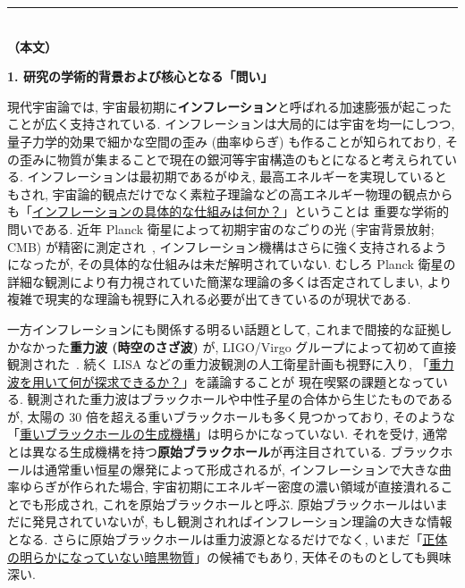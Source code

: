 \documentclass[11pt,a4paper,uplatex,dvipdfmx]{ujarticle} 		%
\newcommand{\研究課題名}{確率解析・原始ブラックホール・重力波観測から迫るインフレーション}
\newcommand{\研究機関名}{名古屋大学}
\newcommand{\研究代表者氏名}{多田祐一郎}
\newcommand{\研究期間の最終元号年度}{6}  %
\renewcommand{\emph}[1]{{\sffamily\gtfamily\bfseries #1}}
\begin{document}
\noindent
\rule{\linewidth}{1pt}\\
\noindent
\textbf{（本文）}

\begin{mdframed}[roundcorner=0.5zw,
	innertopmargin=0.8zw,innerbottommargin=0.8zw,
	linecolor=black!50,linewidth=0.2zw,
	backgroundcolor=black!10]
	{\bfseries\gtfamily\sffamily\large 1. 研究の学術的背景および核心となる「問い」}
\end{mdframed}

\noindent
現代宇宙論では, 宇宙最初期に\emph{インフレーション}と呼ばれる加速膨張が起こったことが広く支持されている.
インフレーションは大局的には宇宙を均一にしつつ, 量子力学的効果で細かな空間の歪み (曲率ゆらぎ) も作ることが知られており, 
その歪みに物質が集まることで現在の銀河等宇宙構造のもとになると考えられている.
インフレーションは最初期であるがゆえ, 最高エネルギーを実現しているともされ,
宇宙論的観点だけでなく素粒子理論などの高エネルギー物理の観点からも「\ul{インフレーションの具体的な仕組みは何か？}」ということは
重要な学術的問いである.
近年 Planck 衛星によって初期宇宙のなごりの光 (宇宙背景放射; CMB) が精密に測定され~\cite{Planck:2013jfk},
インフレーション機構はさらに強く支持されるようになったが, その具体的な仕組みは未だ解明されていない.
むしろ Planck 衛星の詳細な観測により有力視されていた簡潔な理論の多くは否定されてしまい, 
より複雑で現実的な理論も視野に入れる必要が出てきているのが現状である.

一方インフレーションにも関係する明るい話題として, これまで間接的な証拠しかなかった\emph{重力波 (時空のさざ波)} が, 
LIGO/Virgo グループによって初めて直接観測された~\cite{Abbott:2016blz}. 
続く LISA などの重力波観測の人工衛星計画も視野に入り, 「\ul{重力波を用いて何が探求できるか？}」を議論することが
現在喫緊の課題となっている.
観測された重力波はブラックホールや中性子星の合体から生じたものであるが, 
太陽の 30 倍を超える重いブラックホールも多く見つかっており, そのような「\ul{重いブラックホールの生成機構}」は明らかになっていない.
それを受け, 通常とは異なる生成機構を持つ\emph{原始ブラックホール}が再注目されている. 
ブラックホールは通常重い恒星の爆発によって形成されるが, インフレーションで大きな曲率ゆらぎが作られた場合, 
宇宙初期にエネルギー密度の濃い領域が直接潰れることでも形成され, これを原始ブラックホールと呼ぶ. 
原始ブラックホールはいまだに発見されていないが, もし観測されればインフレーション理論の大きな情報となる. 
さらに原始ブラックホールは重力波源となるだけでなく, いまだ「\ul{正体の明らかになっていない暗黒物質}」の候補でもあり, 天体そのものとしても興味深い.
\end{document}
